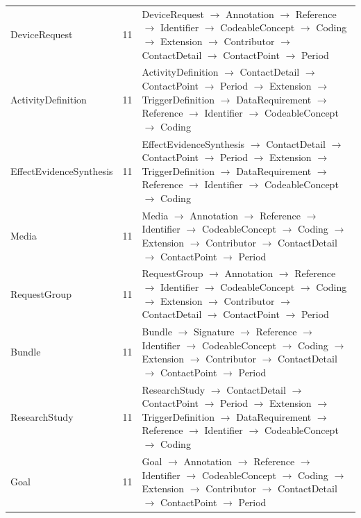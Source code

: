 \begin{longtable}{lrl}
DeviceRequest & 11 & DeviceRequest $\rightarrow$ Annotation $\rightarrow$ Reference $\rightarrow$ Identifier $\rightarrow$ CodeableConcept $\rightarrow$ Coding $\rightarrow$ Extension $\rightarrow$ Contributor $\rightarrow$ ContactDetail $\rightarrow$ ContactPoint $\rightarrow$ Period \\
ActivityDefinition & 11 & ActivityDefinition $\rightarrow$ ContactDetail $\rightarrow$ ContactPoint $\rightarrow$ Period $\rightarrow$ Extension $\rightarrow$ TriggerDefinition $\rightarrow$ DataRequirement $\rightarrow$ Reference $\rightarrow$ Identifier $\rightarrow$ CodeableConcept $\rightarrow$ Coding \\
EffectEvidenceSynthesis & 11 & EffectEvidenceSynthesis $\rightarrow$ ContactDetail $\rightarrow$ ContactPoint $\rightarrow$ Period $\rightarrow$ Extension $\rightarrow$ TriggerDefinition $\rightarrow$ DataRequirement $\rightarrow$ Reference $\rightarrow$ Identifier $\rightarrow$ CodeableConcept $\rightarrow$ Coding \\
Media & 11 & Media $\rightarrow$ Annotation $\rightarrow$ Reference $\rightarrow$ Identifier $\rightarrow$ CodeableConcept $\rightarrow$ Coding $\rightarrow$ Extension $\rightarrow$ Contributor $\rightarrow$ ContactDetail $\rightarrow$ ContactPoint $\rightarrow$ Period \\
RequestGroup & 11 & RequestGroup $\rightarrow$ Annotation $\rightarrow$ Reference $\rightarrow$ Identifier $\rightarrow$ CodeableConcept $\rightarrow$ Coding $\rightarrow$ Extension $\rightarrow$ Contributor $\rightarrow$ ContactDetail $\rightarrow$ ContactPoint $\rightarrow$ Period \\
Bundle & 11 & Bundle $\rightarrow$ Signature $\rightarrow$ Reference $\rightarrow$ Identifier $\rightarrow$ CodeableConcept $\rightarrow$ Coding $\rightarrow$ Extension $\rightarrow$ Contributor $\rightarrow$ ContactDetail $\rightarrow$ ContactPoint $\rightarrow$ Period \\
ResearchStudy & 11 & ResearchStudy $\rightarrow$ ContactDetail $\rightarrow$ ContactPoint $\rightarrow$ Period $\rightarrow$ Extension $\rightarrow$ TriggerDefinition $\rightarrow$ DataRequirement $\rightarrow$ Reference $\rightarrow$ Identifier $\rightarrow$ CodeableConcept $\rightarrow$ Coding \\
Goal & 11 & Goal $\rightarrow$ Annotation $\rightarrow$ Reference $\rightarrow$ Identifier $\rightarrow$ CodeableConcept $\rightarrow$ Coding $\rightarrow$ Extension $\rightarrow$ Contributor $\rightarrow$ ContactDetail $\rightarrow$ ContactPoint $\rightarrow$ Period \\

\end{longtable}
